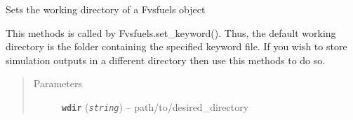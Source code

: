 \documentclass[letterpaper,10pt,english]{sphinxmanual}
\begin{document}
\begin{fulllineitems}

\begin{fulllineitems}
\label{fuels:fuels.Fvsfuels.get_trees}
\end{fulllineitems}


\begin{fulllineitems}
\label{fuels:fuels.Fvsfuels.run_fvs}
\end{fulllineitems}


\begin{fulllineitems}
\label{fuels:fuels.Fvsfuels.save_all}
\end{fulllineitems}


\begin{fulllineitems}
\label{fuels:fuels.Fvsfuels.save_snags_by_year}
\end{fulllineitems}


\begin{fulllineitems}
\label{fuels:fuels.Fvsfuels.save_trees_by_year}
\end{fulllineitems}


\begin{fulllineitems}
\label{fuels:fuels.Fvsfuels.set_dir}
Sets the working directory of a Fvsfuels object

This methods is called by Fvsfuels.set\_keyword(). Thus, the default
working directory is the folder containing the specified keyword file. 
If you wish to store simulation outputs in a different directory then
use this methods to do so.
\begin{quote}\begin{description}
\item[{Parameters}] \leavevmode
\textbf{\texttt{wdir}} (\emph{\texttt{string}}) -- path/to/desired\_directory


\end{description}
\end{quote}
\end{fulllineitems}
\end{fulllineitems}
\end{document}
